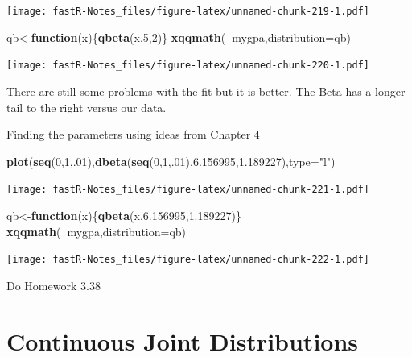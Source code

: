 \documentclass[]{book}
\newenvironment{Shaded}{\begin{snugshade}}{\end{snugshade}}
\newcommand{\KeywordTok}[1]{\textcolor[rgb]{0.13,0.29,0.53}{\textbf{#1}}}
\newcommand{\DataTypeTok}[1]{\textcolor[rgb]{0.13,0.29,0.53}{#1}}
\newcommand{\DecValTok}[1]{\textcolor[rgb]{0.00,0.00,0.81}{#1}}
\newcommand{\FloatTok}[1]{\textcolor[rgb]{0.00,0.00,0.81}{#1}}
\newcommand{\StringTok}[1]{\textcolor[rgb]{0.31,0.60,0.02}{#1}}
\newcommand{\ControlFlowTok}[1]{\textcolor[rgb]{0.13,0.29,0.53}{\textbf{#1}}}
\newcommand{\OperatorTok}[1]{\textcolor[rgb]{0.81,0.36,0.00}{\textbf{#1}}}
\newcommand{\NormalTok}[1]{#1}
\theoremstyle{definition}
\theoremstyle{definition}
\theoremstyle{definition}
\theoremstyle{remark}
\begin{document}
\texttt{[image: fastR-Notes\_files/figure-latex/unnamed-chunk-219-1.pdf]}

\begin{Shaded}
\begin{Highlighting}[]
\NormalTok{qb<-}\ControlFlowTok{function}\NormalTok{(x)\{}\KeywordTok{qbeta}\NormalTok{(x,}\DecValTok{5}\NormalTok{,}\DecValTok{2}\NormalTok{)\}}
\KeywordTok{xqqmath}\NormalTok{(}\OperatorTok{~}\NormalTok{mygpa,}\DataTypeTok{distribution=}\NormalTok{qb)}
\end{Highlighting}
\end{Shaded}

\texttt{[image: fastR-Notes\_files/figure-latex/unnamed-chunk-220-1.pdf]}

There are still some problems with the fit but it is better. The Beta
has a longer tail to the right versus our data.

Finding the parameters using ideas from Chapter 4

\begin{Shaded}
\begin{Highlighting}[]
\KeywordTok{plot}\NormalTok{(}\KeywordTok{seq}\NormalTok{(}\DecValTok{0}\NormalTok{,}\DecValTok{1}\NormalTok{,.}\DecValTok{01}\NormalTok{),}\KeywordTok{dbeta}\NormalTok{(}\KeywordTok{seq}\NormalTok{(}\DecValTok{0}\NormalTok{,}\DecValTok{1}\NormalTok{,.}\DecValTok{01}\NormalTok{),}\FloatTok{6.156995}\NormalTok{,}\FloatTok{1.189227}\NormalTok{),}\DataTypeTok{type=}\StringTok{"l"}\NormalTok{)}
\end{Highlighting}
\end{Shaded}

\texttt{[image: fastR-Notes\_files/figure-latex/unnamed-chunk-221-1.pdf]}

\begin{Shaded}
\begin{Highlighting}[]
\NormalTok{qb<-}\ControlFlowTok{function}\NormalTok{(x)\{}\KeywordTok{qbeta}\NormalTok{(x,}\FloatTok{6.156995}\NormalTok{,}\FloatTok{1.189227}\NormalTok{)\}}
\KeywordTok{xqqmath}\NormalTok{(}\OperatorTok{~}\NormalTok{mygpa,}\DataTypeTok{distribution=}\NormalTok{qb)}
\end{Highlighting}
\end{Shaded}

\texttt{[image: fastR-Notes\_files/figure-latex/unnamed-chunk-222-1.pdf]}

Do Homework 3.38

\hypertarget{L17}{\section{Continuous Joint Distributions}\label{L17}}
\end{document}
